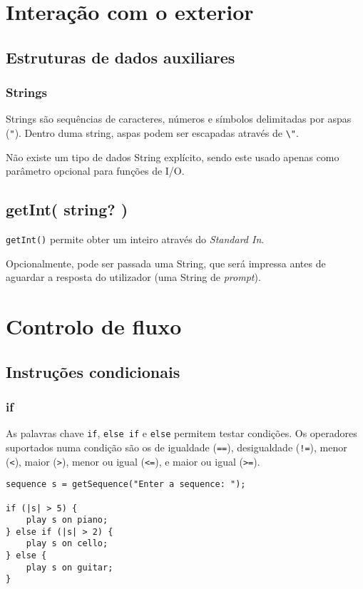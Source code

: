 \documentclass{article}
\begin{document}
\section{Interação com o exterior} \label{exterior}
\subsection{Estruturas de dados auxiliares}
\subsubsection{Strings}
Strings são sequências de caracteres, números e símbolos delimitadas por aspas (\texttt{"}). Dentro duma string, aspas podem ser escapadas através de \texttt{\textbackslash"}.

Não existe um tipo de dados String explícito, sendo este usado apenas como parâmetro opcional para funções de I/O.
\subsection{getInt( string? )}
\texttt{getInt()} permite obter um inteiro através do \textit{Standard In}. 

Opcionalmente, pode ser passada uma String, que será impressa antes de aguardar a resposta do utilizador (uma String de \textit{prompt}).


\section{Controlo de fluxo} \label{flux}
\subsection{Instruções condicionais}
\subsubsection{if}
As palavras chave \texttt{if}, \texttt{else if} e \texttt{else} permitem testar condições. Os operadores suportados numa condição são os de igualdade (\texttt{==}), desigualdade (\texttt{!=}), menor (\texttt{<}), maior (\texttt{>}), menor ou igual (\texttt{<=}), e maior ou igual (\texttt{>=}).
\begin{lstlisting} 
sequence s = getSequence("Enter a sequence: ");

if (|s| > 5) {
    play s on piano;
} else if (|s| > 2) {
    play s on cello;
} else {
    play s on guitar;
}
\end{lstlisting}
\end{document}
